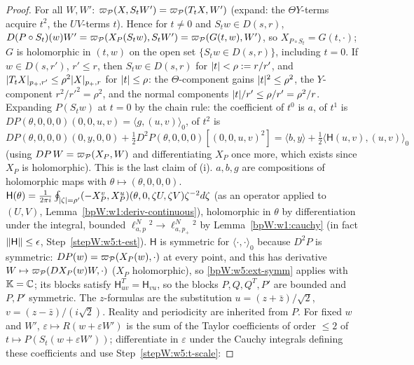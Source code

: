 \begin{proof}
\label{stepW:w5:t-scale} For all $W,W'$: $\varpi_{\mathcal P}(X,S_tW')=\varpi_{\mathcal P}(T_tX,W')$ (expand: the
$\Theta Y$-terms acquire $t^2$, the $UV$-terms $t$). Hence for $t\ne0$ and $S_tw\in D(s,r)$,
$D(P\circ S_t)(w)W'=\varpi_{\mathcal P}(X_P(S_tw),S_tW')=\varpi_{\mathcal P}(G(t,w),W')$, so $X_{P\circ S_t}=G(t,\cdot)$; $G$ is holomorphic in
$(t,w)$ on the open set $\{S_tw\in D(s,r)\}$, including $t=0$.
\label{stepW:w5:t-disc} If $w\in D(s,r')$, $r'\le r$, then $S_tw\in D(s,r)$ for $\lvert t\rvert<\rho:=r/r'$, and
$\lvert T_tX\rvert_{p_+,r'}\le\rho^2\lvert X\rvert_{p_+,r}$ for $\lvert t\rvert\le\rho$: the $\Theta$-component gains $\lvert t\rvert^2\le\rho^2$, the
$Y$-component $r^2/r'^2=\rho^2$, and the normal components $\lvert t\rvert/r'\le\rho/r'=\rho^2/r$.
\label{stepW:w5:t-poly} Expanding $P(S_tw)$ at $t=0$ by the chain rule:
the coefficient of $t^0$ is $a$, of $t^1$ is $DP(\theta,0,0,0)(0,0,u,v)=\langle g,(u,v)\rangle_0$, of $t^2$ is
$DP(\theta,0,0,0)(0,y,0,0)+\frac12D^2P(\theta,0,0,0)[(0,0,u,v)^2]=\langle b,y\rangle+\frac12\langle\mathsf H(u,v),(u,v)\rangle_0$
(using $DP\,W=\varpi_{\mathcal P}(X_P,W)$ and differentiating $X_P$ once more, which exists since $X_P$ is holomorphic). This is the
last claim of (i).
\label{stepW:w5:t-comp} $a,b,g$ are compositions of holomorphic maps with $\theta\mapsto(\theta,0,0,0)$.
$\mathsf H(\theta)=\frac1{2\pi i}\oint_{\lvert \zeta\rvert=\rho'}(-X^v_P,X^u_P)(\theta,0,\zeta U,\zeta V)\zeta^{-2}d\zeta$ (as an
operator applied to $(U,V)$, Lemma~\ref{bpW:w1:deriv-continuous}), holomorphic in $\theta$ by differentiation under the
integral, bounded $\ell^N_{a,p}{}^2\to\ell^N_{a,p_+}{}^2$ by Lemma~\ref{bpW:w1:cauchy} (in fact $\lVert \mathsf H\rVert\le\epsilon$,
Step~\ref{stepW:w5:t-est}). $\mathsf H$ is symmetric for $\langle\cdot,\cdot\rangle_0$ because $D^2P$ is symmetric:
$DP(w)=\varpi_{\mathcal P}(X_P(w),\cdot)$ at every point, and this has derivative $W\mapsto\varpi_{\mathcal P}(DX_P(w)W,\cdot)$ ($X_P$ holomorphic), so
\ref{bpW:w5:ext-symm} applies with $\mathbb K=\mathbb{C}$; its blocks satisfy $\mathsf H_{uv}^T=\mathsf H_{vu}$, so the blocks
$P,Q,Q^T,P'$ are bounded and $P,P'$ symmetric. The $z$-formulas are the substitution $u=(z+\bar z)/\sqrt2$,
$v=(z-\bar z)/(i\sqrt2)$. Reality and periodicity are inherited from $P$.
\label{stepW:w5:t-field} For fixed $w$ and $W'$, $\varepsilon\mapsto R(w+\varepsilon W')$ is the sum of
the Taylor coefficients of order $\le2$ of $t\mapsto P(S_t(w+\varepsilon W'))$; differentiate in $\varepsilon$ under the
Cauchy integrals defining these coefficients and use Step~\ref{stepW:w5:t-scale}:

\end{proof}
